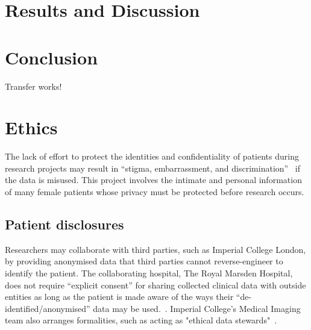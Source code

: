\documentclass[12pt,twoside]{report}
\begin{document}
\chapter{Results and Discussion}\label{sect:results}\label{sect:discussion}




\chapter{Conclusion}

Transfer works!


\chapter{Ethics}

The lack of effort to protect the identities and confidentiality of patients during research projects may result in ``stigma, embarrassment, and discrimination''~\cite{health-privacy} if the data is misused.
This project involves the intimate and personal information of many female patients whose privacy must be protected before research occurs.

\section{Patient disclosures}

Researchers may collaborate with third parties, such as Imperial College London, by providing anonymised data that third parties cannot reverse-engineer to identify the patient. The collaborating hospital, The Royal Marsden Hospital, does not require ``explicit consent'' for sharing collected clinical data with outside entities as long as the patient is made aware of the ways their ``de-identified/anonymised'' data may be used.~\cite{royal-marsden-privacy-note}. Imperial College's Medical Imaging team also arranges formalities, such as acting as "ethical data stewards"~\cite{Larson2020-ib}. 
\end{document}
